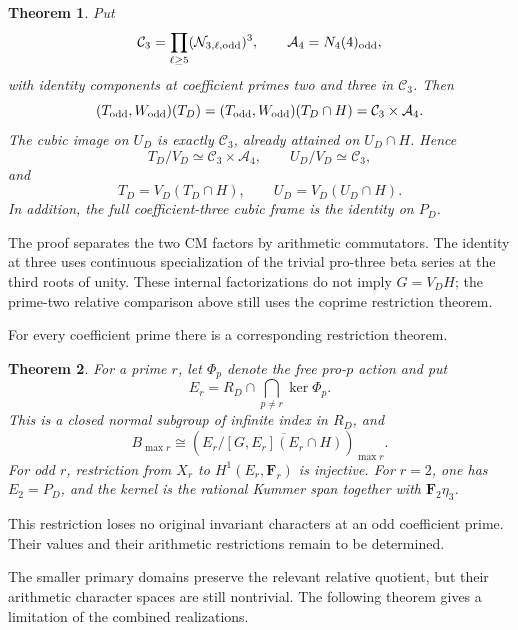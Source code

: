 \documentclass[11pt,a4paper]{article}
\newtheorem{theorem}{Theorem}[section]
\theoremstyle{definition}
\theoremstyle{remark}
\begin{document}
\begin{theorem}\label{thm:main-exact-joint-odd-cm}
Put
\[
 \mathcal C_3=\prod_{\ell\ge5}
           (\mathcal N_{3,\ell,{\rm odd}})^3,
 \qquad \mathcal A_4=N_4(4)_{\rm odd},
\]
with identity components at coefficient primes two and three in
\(\mathcal C_3\). Then
\[
 (T_{\rm odd},W_{\rm odd})(T_D)
 =(T_{\rm odd},W_{\rm odd})(T_D\cap H)
 =\mathcal C_3\times\mathcal A_4.
\]
The cubic image on \(U_D\) is exactly \(\mathcal C_3\), already
attained on \(U_D\cap H\). Hence
\[
 T_D/V_D\simeq\mathcal C_3\times\mathcal A_4,
 \qquad U_D/V_D\simeq\mathcal C_3,
\]
and
\[
 T_D=V_D(T_D\cap H),\qquad U_D=V_D(U_D\cap H).
\]
In addition, the full coefficient-three cubic frame is the identity
on \(P_D\).
\end{theorem}

The proof separates the two CM factors by arithmetic commutators.
The identity at three uses continuous specialization of the trivial
pro-three beta series at the third roots of unity. These internal
factorizations do not imply \(G=V_DH\); the prime-two relative
comparison above still uses the coprime restriction theorem.





For every coefficient prime there is a corresponding restriction theorem.

\begin{theorem}\label{thm:main-primary-residual}
For a prime \(r\), let \(\Phi_p\) denote the free pro-\(p\) action and put
\[
 E_r=R_D\cap\bigcap_{p\ne r}\ker\Phi_p.
\]
This is a closed normal subgroup of infinite index in \(R_D\), and
\[
 B_{\max r}\cong
 \left(E_r/\overline{[G,E_r](E_r\cap H)}\right)_{\max r}.
\]
For odd \(r\), restriction from \(X_r\) to \(H^1(E_r,\mathbf F_r)\)
is injective. For \(r=2\), one has \(E_2=P_D\), and the kernel is
the rational Kummer span together with \(\mathbf F_2\eta_3\).
\end{theorem}

This restriction loses no original invariant characters at an odd
coefficient prime. Their values and their arithmetic restrictions
remain to be determined.

The smaller primary domains preserve the relevant relative quotient,
but their arithmetic character spaces are still nontrivial. The
following theorem gives a limitation of the combined realizations.
\end{document}
